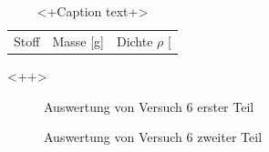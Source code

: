 \documentclass[12pt,a4paper,titlepage,headinclude,bibtotoc]{scrartcl}
\begin{document}
\begin{table}
	\centering
	\begin{tabular}{|c|c|c|}
		Stoff &	Masse [g]	& Dichte $\rho$ [
	\end{tabular}
	\caption{<+Caption text+>}
	\label{tab:<+label+>}
\end{table}<++>


\begin{figure}[h]
\centering
{}
\caption{Auswertung von Versuch 6 erster Teil}
\label{fig:aus61}
\end{figure}
\begin{figure}[h]
\centering
{}
\caption{Auswertung von Versuch 6 zweiter Teil}
\label{fig:aus62}
\end{figure}
\end{document}
